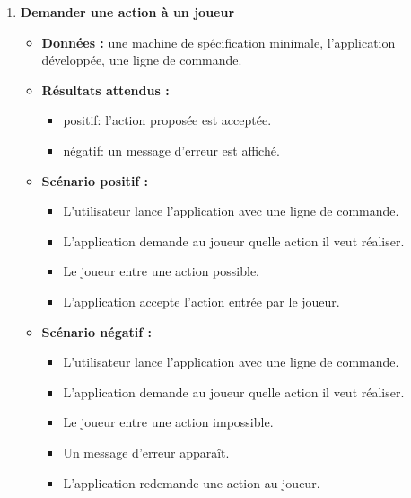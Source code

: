 \begin{enumerate}
    \item \textbf{Demander une action à un joueur}
    \begin{itemize}
        \item \textbf{Données :} une machine de spécification minimale, l'application développée, une ligne de commande.
        \item \textbf{Résultats attendus :}
        \begin{itemize}
            \item positif: l'action proposée est acceptée.
            \item négatif: un message d'erreur est affiché.
        \end{itemize}
        \item \textbf{Scénario positif :}
        \begin{itemize}
            \item L'utilisateur lance l'application avec une ligne de commande.
            \item L'application demande au joueur quelle action il veut réaliser.
            \item Le joueur entre une action possible.
            \item L'application accepte l'action entrée par le joueur.
        \end{itemize}
        \item \textbf{Scénario négatif :}
        \begin{itemize}
            \item L'utilisateur lance l'application avec une ligne de commande.
            \item L'application demande au joueur quelle action il veut réaliser.
            \item Le joueur entre une action impossible.
            \item Un message d'erreur apparaît.
            \item L'application redemande une action au joueur.
        \end{itemize}
    \end{itemize}


\end{enumerate}
